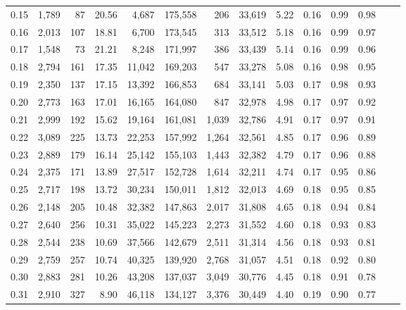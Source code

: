 \begin{tabular}{rrrrrrrrrrrrrr}
0.15 &  1,789 &     87 &   20.56 &    4,687 &  175,558 &     206 &  33,619 &  5.22 &  0.16 &  0.99 &      0.98 \\
0.16 &  2,013 &    107 &   18.81 &    6,700 &  173,545 &     313 &  33,512 &  5.18 &  0.16 &  0.99 &      0.97 \\
0.17 &  1,548 &     73 &   21.21 &    8,248 &  171,997 &     386 &  33,439 &  5.14 &  0.16 &  0.99 &      0.96 \\
0.18 &  2,794 &    161 &   17.35 &   11,042 &  169,203 &     547 &  33,278 &  5.08 &  0.16 &  0.98 &      0.95 \\
0.19 &  2,350 &    137 &   17.15 &   13,392 &  166,853 &     684 &  33,141 &  5.03 &  0.17 &  0.98 &      0.93 \\
0.20 &  2,773 &    163 &   17.01 &   16,165 &  164,080 &     847 &  32,978 &  4.98 &  0.17 &  0.97 &      0.92 \\
0.21 &  2,999 &    192 &   15.62 &   19,164 &  161,081 &   1,039 &  32,786 &  4.91 &  0.17 &  0.97 &      0.91 \\
0.22 &  3,089 &    225 &   13.73 &   22,253 &  157,992 &   1,264 &  32,561 &  4.85 &  0.17 &  0.96 &      0.89 \\
0.23 &  2,889 &    179 &   16.14 &   25,142 &  155,103 &   1,443 &  32,382 &  4.79 &  0.17 &  0.96 &      0.88 \\
0.24 &  2,375 &    171 &   13.89 &   27,517 &  152,728 &   1,614 &  32,211 &  4.74 &  0.17 &  0.95 &      0.86 \\
0.25 &  2,717 &    198 &   13.72 &   30,234 &  150,011 &   1,812 &  32,013 &  4.69 &  0.18 &  0.95 &      0.85 \\
0.26 &  2,148 &    205 &   10.48 &   32,382 &  147,863 &   2,017 &  31,808 &  4.65 &  0.18 &  0.94 &      0.84 \\
0.27 &  2,640 &    256 &   10.31 &   35,022 &  145,223 &   2,273 &  31,552 &  4.60 &  0.18 &  0.93 &      0.83 \\
0.28 &  2,544 &    238 &   10.69 &   37,566 &  142,679 &   2,511 &  31,314 &  4.56 &  0.18 &  0.93 &      0.81 \\
0.29 &  2,759 &    257 &   10.74 &   40,325 &  139,920 &   2,768 &  31,057 &  4.51 &  0.18 &  0.92 &      0.80 \\
0.30 &  2,883 &    281 &   10.26 &   43,208 &  137,037 &   3,049 &  30,776 &  4.45 &  0.18 &  0.91 &      0.78 \\
0.31 &  2,910 &    327 &    8.90 &   46,118 &  134,127 &   3,376 &  30,449 &  4.40 &  0.19 &  0.90 &      0.77 \\

\end{tabular}
